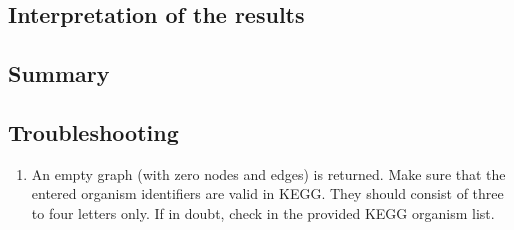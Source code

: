 \subsection{Interpretation of the results}




\subsection{Summary}


\subsection{Troubleshooting}

\begin{enumerate}

\item An empty graph (with zero nodes and edges) is returned.
Make sure that the entered organism identifiers are valid in KEGG.
They should consist of three to four letters only. If in doubt,
check in the provided KEGG organism list.

\end{enumerate}
